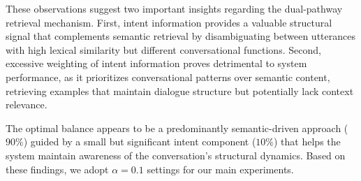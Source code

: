 \documentclass[
]{style/ceurart}
\begin{document}
These observations suggest two important insights regarding the dual-pathway retrieval mechanism. First, intent information provides a valuable structural signal that complements semantic retrieval by disambiguating between utterances with high lexical similarity but different conversational functions. Second, excessive weighting of intent information proves detrimental to system performance, as it prioritizes conversational patterns over semantic content, retrieving examples that maintain dialogue structure but potentially lack context relevance.

The optimal balance appears to be a predominantly semantic-driven approach ($90\%$) guided by a small but significant intent component ($10\%$) that helps the system maintain awareness of the conversation's structural dynamics. Based on these findings, we adopt $\alpha=0.1$ settings for our main experiments.

\end{document}
